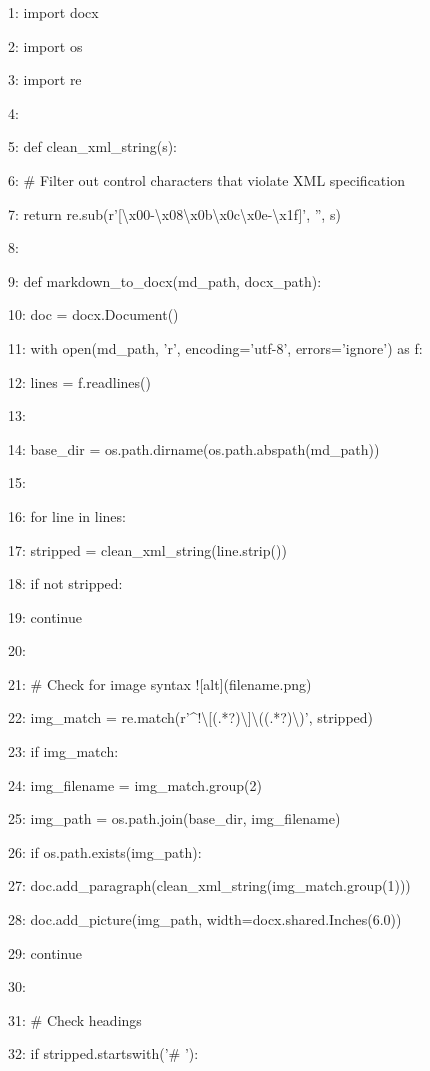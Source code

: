 \documentclass[11pt,a4paper]{article}
\begin{document}
{1: import docx

2: import os

3: import re

4:

5: def clean\_xml\_string(s):

6:     \# Filter out control characters that violate XML specification

7:     return re.sub(r'[\textbackslash{}x00-\textbackslash{}x08\textbackslash{}x0b\textbackslash{}x0c\textbackslash{}x0e-\textbackslash{}x1f]', '', s)

8:

9: def markdown\_to\_docx(md\_path, docx\_path):

10:     doc = docx.Document()

11:     with open(md\_path, 'r', encoding='utf-8', errors='ignore') as f:

12:         lines = f.readlines()

13:

14:     base\_dir = os.path.dirname(os.path.abspath(md\_path))

15:

16:     for line in lines:

17:         stripped = clean\_xml\_string(line.strip())

18:         if not stripped:

19:             continue

20:

21:         \# Check for image syntax ![alt](filename.png)

22:         img\_match = re.match(r'\textasciicircum{}!\textbackslash{}[(.*?)\textbackslash{}]\textbackslash{}((.*?)\textbackslash{})', stripped)

23:         if img\_match:

24:             img\_filename = img\_match.group(2)

25:             img\_path = os.path.join(base\_dir, img\_filename)

26:             if os.path.exists(img\_path):

27:                 doc.add\_paragraph(clean\_xml\_string(img\_match.group(1)))

28:                 doc.add\_picture(img\_path, width=docx.shared.Inches(6.0))

29:             continue

30:

31:         \# Check headings

32:         if stripped.startswith('\# '):

}
\end{document}
